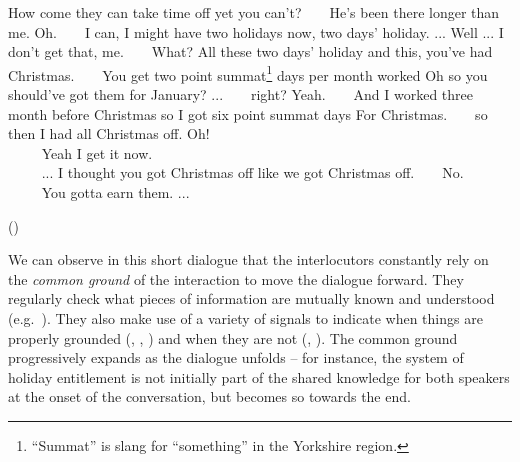 \begin{dialogue} 
 How come they can take time off yet you can't?
 $\ \ \ \ \ \ $ He's been there longer than me.
 Oh.
  $\ \ \ \ \ \ $ I can, I might have two holidays now, two days' holiday. ...
 Well ... I don't get that, me.
  $\ \ \ \ \ \ $ What?
 All these two days' holiday and this, you've had Christmas.
  $\ \ \ \ \ \ $ You get two point summat\footnote{``Summat'' is slang for ``something'' in the Yorkshire region. } days per month worked
 Oh so you should've got them for January? ...
  $\ \ \ \ \ \ $ right?
 Yeah.
  $\ \ \ \ \ \ $ And I worked three month before Christmas so I got six point summat days
 For Christmas.
  $\ \ \ \ \ \ $ so then I had all Christmas off.
 Oh! \\
 $\phantom{a} \ \ \ \ \ \ \ $ Yeah I get it now. \\
 $\phantom{a} \ \ \ \ \ \ \ $ ... I thought you got Christmas off like we got Christmas off.
  $\ \ \ \ \ \ $ No. \\ 
 $\phantom{a} \ \ \ \ \ \ \ $ You gotta earn them. ... \vspace{-2mm}
 \begin{flushright}\begin{scriptsize}()\end{scriptsize}\end{flushright} 
\end{dialogue} 

We can observe in this short dialogue that the interlocutors constantly rely on the \textit{common ground} of the interaction to move the dialogue forward.  They regularly check what pieces of information are mutually known and understood (e.g.\ ).  They also make use of a variety of signals to indicate when things are properly grounded (, , ) and when they are not (, ). The common ground progressively expands as the dialogue unfolds -- for instance, the system of holiday entitlement is not initially part of the shared knowledge for both speakers at the onset of the conversation, but becomes so towards the end. 

